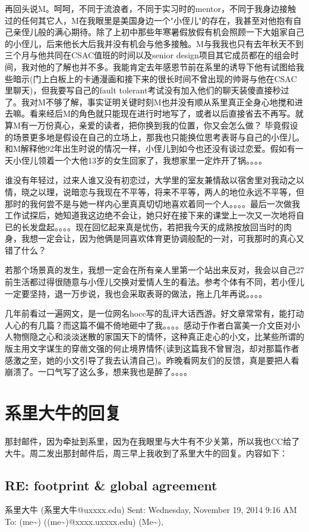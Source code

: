 \documentclass[12pt]{book}
\begin{document}
再回头说M。呵呵，不同于流浪者，不同于实习时的mentor，不同于我身边接触过的任何其它人，M在我眼里是美国身边一个"小侄儿"的存在，我甚至对他抱有自己亲侄儿般的满心期待。除了上初中那些年寒暑假放假有机会照顾一下大姐家自己的小侄儿，后来他长大后我并没有机会与他多接触。M与我我也只有去年秋天不到三个月与他共同在CSAC值班的时间以及senior design项目其它成员都在的组会时间，我对他的了解也并不多。我能肯定去年感恩节前在系里的诱导下他有试图给我些暗示(门上白板上的卡通漫画和接下来的很长时间不曾出现的帅哥与他在CSAC里聊天)，但我要写自己的fault tolerant考试没有加入他们的聊天装傻直接秒过了。我对M不够了解，事实证明关键时刻M也并没有顺从系里真正全身心地搅和进去嘛。看来经后M的角色就只能现在进行时地写了，或者以后直接省去不再写。就算M有一万份真心，亲爱的读者，把你换到我的位置，你又会怎么做？ 
毕竟假设的场景更多地是假设在自己的立场上，那我也只能换位思考表哥与自己的小侄儿。和M解释他92年出生时说的情况一样，小侄儿到如今也还没有谈过恋爱。假如有一天小侄儿领着一个大他13岁的女生回家了，我想家里一定炸开了锅。。。。

谁没有年轻过，过来人谁又没有初恋过，大学里的室友兼情敌以宿舍里对我动之以情，晓之以理，说暗恋与我现在不平等，将来不平等，两人的地位永远不平等，但那时的我何尝不是与她一样内心里真真切切地喜欢着同一个人。。。。最后一次做我工作试探后，她知道我这边绝不会让，她只好在接下来的课堂上一次又一次地将自已的长发盘起。。。。现在回忆起来真是忧伤，若把我今天的成熟按放回当时的肉身，我想一定会让，因为他俩是同喜欢体育更协调般配的一对，可我那时的真心又错了什么？

若那个场景真的发生，我想一定会在所有亲人里第一个站出来反对，我会以自己27前生活都过得很随意与小侄儿交换对爱情人生的看法。参考个体有不同，若小侄儿一定要坚持，退一万步说，我也会采取表哥的做法，拖上几年再说。。。。

几年前看过一遍网文，是一位网名hocc写的乱评大话西游。好文章常常有，能打动人心的有几篇？而这篇不偏不倚地砸中了我。。。。感动于作者白富美一介文臣对小人物恻隐之心和淡淡迷散的家国天下的情怀，这种真正走心的小文，比某些所谓的版主用文字谋生的穿凿文强的何止境界情怀(读到这篇我不曾冒泡，却对那篇作者感激之至，她的小文引导了我去认清自己)。昨晚看网友们的反馈，真是要把人看崩溃了。一口气写了这么多，想来我也是醉了。。。。

\chapter{系里大牛的回复}
\label{sec-31}
那封邮件，因为牵扯到系里，因为在我眼里与大牛有不少关第，所以我也CC给了大牛。周二发出那封邮件后，周三早上我收到了系里大牛的回复。内容如下：

\section{RE: footprint \& global agreement}
\label{sec-31-1}
系里大牛 (系里大牛@uxxxx.edu)
Sent:        Wednesday, November 19, 2014 9:16 AM
To:        
(me\textasciitilde{}) ((me\textasciitilde{})@xxxx.uxxxx.edu)
(Me\textasciitilde{}),
\end{document}
